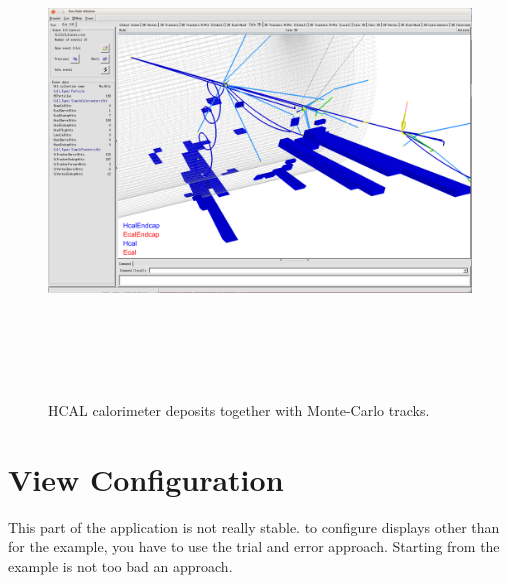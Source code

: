 \documentclass[10pt,a4paper]{article}
\begin{document}
\newpage
\noindent
\begin{figure}[h]
  \begin{center}
    \includegraphics[height=130mm] {DDEve_8.png}
    \caption{HCAL calorimeter deposits together with Monte-Carlo tracks.}
    \label{fig:DDEve_5}
  \end{center}
\end{figure}


\section{View Configuration}
\label{sec:ddeve-user-manual-display-configuration}
\noindent
This part of the \DDE application is not really stable. to configure displays
other than for the  example, you have to use the trial and error 
approach. Starting from the  example is not too bad an approach.


\newpage
\begin{thebibliography}{9}

\end{thebibliography}
\end{document}
